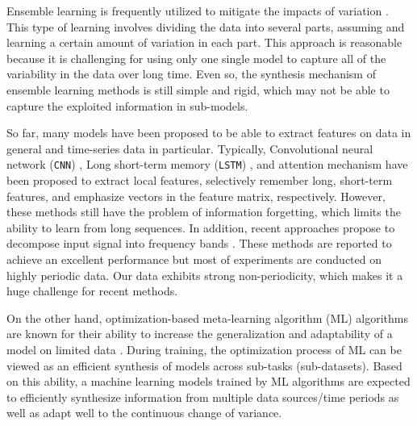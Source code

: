 \documentclass[a4paper,fleqn]{cas-sc}
\begin{document}
Ensemble learning is frequently utilized to mitigate the impacts of variation \cite{ali2020complete, sadeghi2021combined, zafeiriou2020intraday}. This type of learning involves dividing the data into several parts, assuming and learning a certain amount of variation in each part. This approach is reasonable because it is challenging for using only one single model to capture all of the variability in the data over long time. Even so, the synthesis mechanism of ensemble learning methods is still simple and rigid, which may not be able to capture the exploited information in sub-models.

\vspace{1mm}

So far, many models have been proposed to be able to extract features on data in general and time-series data in particular. Typically, Convolutional neural network (\verb|CNN|) \cite{lecun1989handwritten}, Long short-term memory (\verb|LSTM|) \cite{hochreiter1997long}, and attention mechanism \cite{bahdanau2014neural, luong2015effective, vaswani2017attention} have been proposed to extract local features, selectively remember long, short-term features, and emphasize vectors in the feature matrix, respectively. However, these methods still have the problem of information forgetting, which limits the ability to learn from long sequences. In addition, recent approaches propose to decompose input signal into frequency bands \cite{chen2021autoformer, liu2022scinet, zhou2022fedformer}. These methods are reported to achieve an excellent performance but most of experiments are conducted on highly periodic data. Our data exhibits strong non-periodicity, which makes it a huge challenge for recent methods.

\vspace{1mm}

On the other hand, optimization-based meta-learning algorithm (ML) algorithms are known for their ability to increase the generalization and adaptability of a model on limited data \cite{hospedales2021meta, vettoruzzo2024advances}. During training, the optimization process of ML can be viewed as an efficient synthesis of models across sub-tasks (sub-datasets). Based on this ability, a machine learning models trained by ML algorithms are expected to efficiently synthesize information from multiple data sources/time periods as well as adapt well to the continuous change of variance.

\vspace{1mm}
\end{document}
